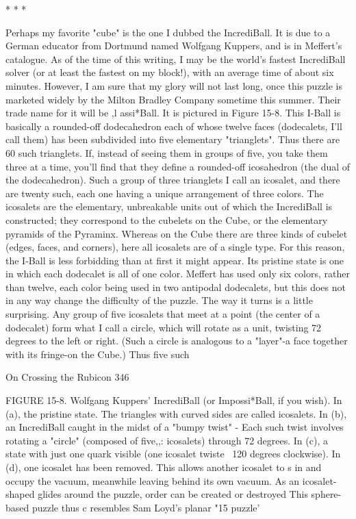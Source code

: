                                          *   *   *

Perhaps my favorite "cube" is the one I dubbed the IncrediBall. It is due to a
German educator from Dortmund named Wolfgang Kuppers, and is in Meffert's
catalogue. As of the time of this writing, I may be the world's fastest IncrediBall
solver (or at least the fastest on my block!), with an average time of about six
minutes. However, I am sure that my glory will not last long, once this puzzle is
marketed widely by the Milton Bradley Company sometime this summer. Their
trade name for it will be ,l assi*Ball. It is pictured in Figure 15-8.
       This I-Ball is basically a rounded-off dodecahedron each of whose twelve
faces (dodecalets, I'll call them) has been subdivided into five elementary
"trianglets". Thus there are 60 such trianglets. If, instead of seeing them in groups
of five, you take them three at a time, you'll find that they define a rounded-off
icosahedron (the dual of the dodecahedron). Such a group of three trianglets I call
an icosalet, and there are twenty such, each one having a unique arrangement of
three colors. The icosalets are the elementary, unbreakable units out of which the
IncrediBall is constructed; they correspond to the cubelets on the Cube, or the
elementary pyramids of the Pyraminx. Whereas on the Cube there are three kinds
of cubelet (edges, faces, and corners), here all icosalets are of a single type. For
this reason, the I-Ball is less forbidding than at first it might appear. Its pristine
state is one in which each dodecalet is all of one color. Meffert has used only six
colors, rather than twelve, each color being used in two antipodal dodecalets, but
this does not in any way change the difficulty of the puzzle.
       The way it turns is a little surprising. Any group of five icosalets that meet at
a point (the center of a dodecalet) form what I call a circle, which will rotate as a
unit, twisting 72 degrees to the left or right. (Such a circle is analogous to a
"layer"-a face together with its fringe-on the Cube.) Thus five such




On Crossing the Rubicon                                                                346

FIGURE 15-8. Wolfgang Kuppers' IncrediBall (or Impossi*Ball, if you wish). In
(a), the pristine state. The triangles with curved sides are called icosalets. In (b),
an IncrediBall caught in the midst of a "bumpy twist" - Each such twist involves
rotating a "circle" (composed of five,,: icosalets) through 72 degrees. In (c), a state
with just one quark visible (one icosalet twiste ~120 degrees clockwise). In (d), one
icosalet has been removed. This allows another icosalet to s in and occupy the
vacuum, meanwhile leaving behind its own vacuum. As an icosalet-shaped glides
around the puzzle, order can be created or destroyed This sphere-based puzzle
thus c resembles Sam Loyd's planar "15 puzzle'





